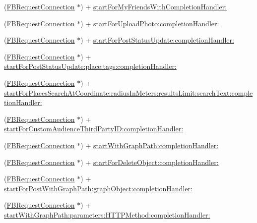 \begin{DoxyCompactItemize}
\item 
(\hyperlink{interfaceFBRequestConnection}{F\+B\+Request\+Connection} $\ast$) + \hyperlink{interfaceFBRequestConnection_a1eeb9942474312db3197be0fa569bc60}{start\+For\+My\+Friends\+With\+Completion\+Handler\+:}
\item 
(\hyperlink{interfaceFBRequestConnection}{F\+B\+Request\+Connection} $\ast$) + \hyperlink{interfaceFBRequestConnection_a824e16e083537312be6d59c8bece3f0e}{start\+For\+Upload\+Photo\+:completion\+Handler\+:}
\item 
(\hyperlink{interfaceFBRequestConnection}{F\+B\+Request\+Connection} $\ast$) + \hyperlink{interfaceFBRequestConnection_a0dee12879e90db0c29e15916375c73b0}{start\+For\+Post\+Status\+Update\+:completion\+Handler\+:}
\item 
(\hyperlink{interfaceFBRequestConnection}{F\+B\+Request\+Connection} $\ast$) + \hyperlink{interfaceFBRequestConnection_a98c2c8abc0efadda28f1c21ec0878a05}{start\+For\+Post\+Status\+Update\+:place\+:tags\+:completion\+Handler\+:}
\item 
(\hyperlink{interfaceFBRequestConnection}{F\+B\+Request\+Connection} $\ast$) + \hyperlink{interfaceFBRequestConnection_abc6f5878bcfabf0b419347a4cbfb2f68}{start\+For\+Places\+Search\+At\+Coordinate\+:radius\+In\+Meters\+:results\+Limit\+:search\+Text\+:completion\+Handler\+:}
\item 
(\hyperlink{interfaceFBRequestConnection}{F\+B\+Request\+Connection} $\ast$) + \hyperlink{interfaceFBRequestConnection_ab2ed1b7d417b4c723b37512870a5add9}{start\+For\+Custom\+Audience\+Third\+Party\+I\+D\+:completion\+Handler\+:}
\item 
(\hyperlink{interfaceFBRequestConnection}{F\+B\+Request\+Connection} $\ast$) + \hyperlink{interfaceFBRequestConnection_ad5b57e64c614dcb04a71e62ee11a87d5}{start\+With\+Graph\+Path\+:completion\+Handler\+:}
\item 
(\hyperlink{interfaceFBRequestConnection}{F\+B\+Request\+Connection} $\ast$) + \hyperlink{interfaceFBRequestConnection_a3fc3ae420d8e47fd0b7a6b915622c527}{start\+For\+Delete\+Object\+:completion\+Handler\+:}
\item 
(\hyperlink{interfaceFBRequestConnection}{F\+B\+Request\+Connection} $\ast$) + \hyperlink{interfaceFBRequestConnection_ac79fe3711cf5a9dd8a9dde04638ca255}{start\+For\+Post\+With\+Graph\+Path\+:graph\+Object\+:completion\+Handler\+:}
\item 
(\hyperlink{interfaceFBRequestConnection}{F\+B\+Request\+Connection} $\ast$) + \hyperlink{interfaceFBRequestConnection_aff0e9852584fcd2c81eb7f4751ef0ee2}{start\+With\+Graph\+Path\+:parameters\+:\+H\+T\+T\+P\+Method\+:completion\+Handler\+:}

\end{DoxyCompactItemize}

